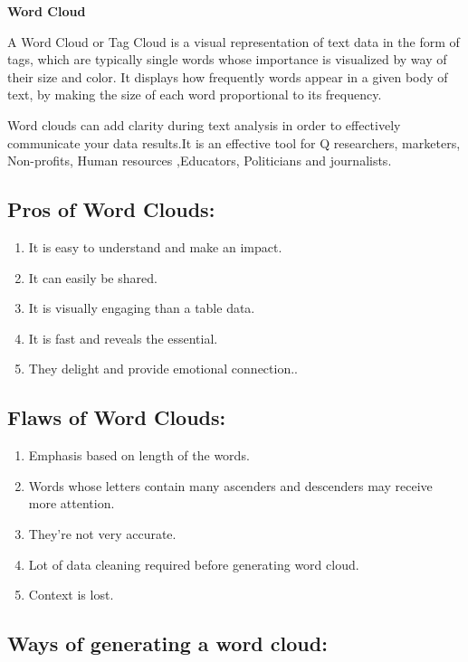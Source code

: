 \documentclass[]{book}
\providecommand{\tightlist}{%
  \setlength{\itemsep}{0pt}\setlength{\parskip}{0pt}}
\theoremstyle{definition}
\theoremstyle{definition}
\theoremstyle{definition}
\theoremstyle{remark}
\begin{document}
\textbf{Word Cloud}

A Word Cloud or Tag Cloud is a visual representation of text data in the
form of tags, which are typically single words whose importance is
visualized by way of their size and color. It displays how frequently
words appear in a given body of text, by making the size of each word
proportional to its frequency.

Word clouds can add clarity during text analysis in order to effectively
communicate your data results.It is an effective tool for Q researchers,
marketers, Non-profits, Human resources ,Educators, Politicians and
journalists.

\subsection{Pros of Word Clouds:}\label{pros-of-word-clouds}

\begin{enumerate}
\def\labelenumi{\arabic{enumi}.}
\tightlist
\item
  It is easy to understand and make an impact.
\item
  It can easily be shared.
\item
  It is visually engaging than a table data.
\item
  It is fast and reveals the essential.
\item
  They delight and provide emotional connection..
\end{enumerate}

\subsection{Flaws of Word Clouds:}\label{flaws-of-word-clouds}

\begin{enumerate}
\def\labelenumi{\arabic{enumi}.}
\tightlist
\item
  Emphasis based on length of the words.
\item
  Words whose letters contain many ascenders and descenders may receive
  more attention.
\item
  They're not very accurate.
\item
  Lot of data cleaning required before generating word cloud.
\item
  Context is lost.
\end{enumerate}

\citep{wordcloud}

\subsection{Ways of generating a word
cloud:}\label{ways-of-generating-a-word-cloud}
\end{document}
